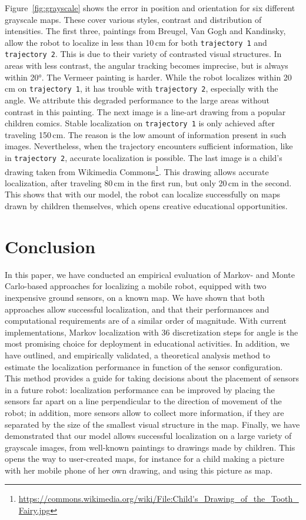 \documentclass[letterpaper, 10pt, conference]{ieeeconf}
\newcommand{\Fig}[1]{Figure~\ref{fig:#1}}
\begin{document}
\Fig{grayscale} shows the error in position and orientation for six different grayscale maps.
These cover various styles, contrast and distribution of intensities.
The first three, paintings from Breugel, Van Gogh and Kandinsky, allow the robot to localize in less than 10\,cm for both \texttt{trajectory~1} and \texttt{trajectory~2}.
This is due to their variety of contrasted visual structures.
In areas with less contrast, the angular tracking becomes imprecise, but is always within 20°.
The Vermeer painting is harder.
While the robot localizes within 20\,cm on \texttt{trajectory~1}, it has trouble with \texttt{trajectory~2}, especially with the angle.
We attribute this degraded performance to the large areas without contrast in this painting.
The next image is a line-art drawing from a popular children comics.
Stable localization on \texttt{trajectory~1} is only achieved after traveling 150\,cm.
The reason is the low amount of information present in such images.
Nevertheless, when the trajectory encounters sufficient information, like in \texttt{trajectory~2}, accurate localization is possible.
The last image is a child's drawing taken from Wikimedia Commons\footnote{\url{https://commons.wikimedia.org/wiki/File:Child's_Drawing_of_the_Tooth_Fairy.jpg}}.
This drawing allows accurate localization, after traveling 80\,cm in the first run, but only 20\,cm in the second.
This shows that with our model, the robot can localize successfully on maps drawn by children themselves, which opens creative educational opportunities.

\section{Conclusion}

In this paper, we have conducted an empirical evaluation of Markov- and Monte Carlo-based approaches for localizing a mobile robot, equipped with two inexpensive ground sensors, on a known map.
We have shown that both approaches allow successful localization, and that their performances and computational requirements are of a similar order of magnitude.
With current implementations, Markov localization with 36 discretization steps for angle is the most promising choice for deployment in educational activities.
In addition, we have outlined, and empirically validated, a theoretical analysis method to estimate the localization performance in function of the sensor configuration.
This method provides a guide for taking decisions about the placement of sensors in a future robot:
localization performance can be improved by placing the sensors far apart on a line perpendicular to the direction of movement of the robot; in addition, more sensors allow to collect more information, if they are separated by the size of the smallest visual structure in the map.
Finally, we have demonstrated that our model allows successful localization on a large variety of grayscale images, from well-known paintings to drawings made by children.
This opens the way to user-created maps, for instance for a child making a picture with her mobile phone of her own drawing, and using this picture as map.
\end{document}
